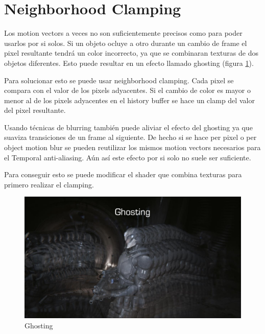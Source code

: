 \documentclass[withindex, glossary]{cam-thesis}
\begin{document}
\section{Neighborhood Clamping}

Los motion vectors a veces no son suficientemente precisos como para poder usarlos por si solos. Si un objeto ocluye a otro durante un cambio de frame el pixel resultante tendrá un color incorrecto, ya que se combinaran texturas de dos objetos diferentes. Esto puede resultar en un efecto llamado ghosting (figura \ref{ghosting}).

Para solucionar esto se puede usar neighborhood clamping. Cada pixel se compara con el valor de los pixels adyacentes. Si el cambio de color es mayor o menor al de los pixels adyacentes en el history buffer se hace un clamp del valor del pixel resultante.

Usando técnicas de blurring también puede aliviar el efecto del ghosting ya que suaviza transiciones de un frame al siguiente. De hecho si se hace per pixel o per object motion blur se pueden reutilizar los mismos motion vectors necesarios para el Temporal anti-aliasing. Aún así este efecto por si solo no suele ser suficiente.

Para conseguir esto se puede modificar el shader que combina texturas para primero realizar el clamping.

\begin{figure}[!htbp]
    \includegraphics[width=.8\linewidth]{figures/ghosting.png}
    \caption{Ghosting\cite{unrealtaa}}
    \label{ghosting}
\end{figure}
\end{document}
